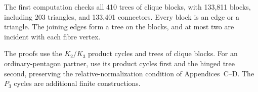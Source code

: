 The first computation checks all 410 trees of clique blocks, with 133,811 blocks,
including 203 triangles, and 133,401 connectors. Every block is an edge
or a triangle. The joining edges form a tree on the blocks, and at
most two are incident with each fibre vertex.

The proofs use the $K_2/K_3$ product cycles and trees of clique blocks.
For an ordinary-pentagon partner, use its product cycles first and the
hinged tree second, preserving the relative-normalization condition of
Appendices~C--D. The $P_3$ cycles are additional finite constructions.
